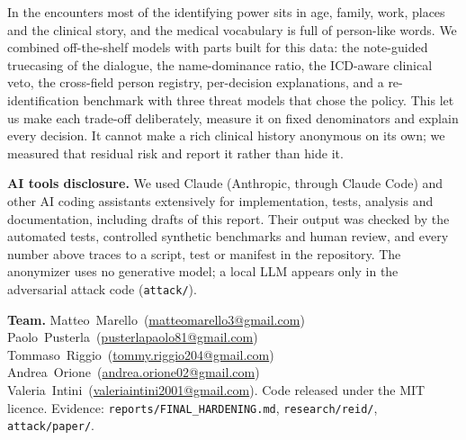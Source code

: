 \documentclass[10pt,a4paper]{article}
\makeatletter
\renewcommand\section{\@startsection{section}{1}{\z@}{-1.5ex plus -.3ex minus -.2ex}{0.5ex}{\normalfont\large\bfseries\color{accent}}}
\newcommand{\code}[1]{\texttt{\small #1}}
\makeatother
\begin{document}
\section{Conclusion}
In the encounters most of the identifying power sits in age, family, work,
places and the clinical story, and the medical vocabulary is full of person-like words. We combined off-the-shelf models
with parts built for this data: the note-guided truecasing of the dialogue, the name-dominance ratio, the ICD-aware
clinical veto, the cross-field person registry, per-decision explanations, and a re-identification benchmark with
three threat models that chose the policy. This let us make each trade-off deliberately, measure it on fixed
denominators and explain every decision. It cannot make a rich clinical history anonymous on its own; we measured that residual risk
and report it rather than hide it.

\textbf{AI tools disclosure.} We used Claude (Anthropic, through Claude Code) and other AI coding assistants
extensively for implementation, tests, analysis and documentation, including drafts of this report. Their output was
checked by the automated tests, controlled synthetic benchmarks and human review, and every number above traces to a
script, test or manifest in the repository. The anonymizer uses no generative model; a local LLM appears only in the
adversarial attack code (\code{attack/}).

{\raggedright\textbf{Team.} \mbox{Matteo Marello (\href{mailto:matteomarello3@gmail.com}{matteomarello3@gmail.com})} \textperiodcentered{}
\mbox{Paolo Pusterla (\href{mailto:pusterlapaolo81@gmail.com}{pusterlapaolo81@gmail.com})} \textperiodcentered{}
\mbox{Tommaso Riggio (\href{mailto:tommy.riggio204@gmail.com}{tommy.riggio204@gmail.com})} \textperiodcentered{}
\mbox{Andrea Orione (\href{mailto:andrea.orione02@gmail.com}{andrea.orione02@gmail.com})} \textperiodcentered{}
\mbox{Valeria Intini (\href{mailto:valeriaintini2001@gmail.com}{valeriaintini2001@gmail.com})}.
Code released under the MIT licence. Evidence: \code{reports/FINAL\_HARDENING.md}, \code{research/reid/}, \code{attack/paper/}.\par}
\end{document}
